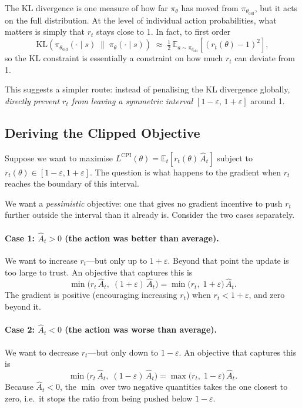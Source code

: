 \documentclass[12pt, a4paper]{article}
\theoremstyle{definition}
\theoremstyle{plain}
\theoremstyle{remark}
\newcommand{\E}{\mathbb{E}}
\newcommand{\pith}{\pi_\theta}
\newcommand{\piold}{\pi_{\theta_\mathrm{old}}}
\newcommand{\KL}{\mathrm{KL}}
\begin{document}
The KL divergence is one measure of how far $\pith$ has moved from $\piold$, but it
acts on the full distribution.  At the level of individual action probabilities, what
matters is simply that $r_t$ stays close to 1.  In fact, to first order
\begin{equation}
  \KL\!\left(\piold(\cdot \mid s) \;\|\; \pith(\cdot \mid s)\right)
  \;\approx\;
  \tfrac{1}{2}\,\E_{a \sim \piold}\!\left[(r_t(\theta) - 1)^2\right],
\end{equation}
so the KL constraint is essentially a constraint on how much $r_t$ can deviate from 1.

This suggests a simpler route: instead of penalising the KL divergence globally,
\emph{directly prevent $r_t$ from leaving a symmetric interval
$[1 - \varepsilon,\, 1 + \varepsilon]$} around 1.

\subsection{Deriving the Clipped Objective}

Suppose we want to maximise $L^{\mathrm{CPI}}(\theta) = \E_t[r_t(\theta)\,\hat{A}_t]$
subject to $r_t(\theta) \in [1-\varepsilon, 1+\varepsilon]$.  The question is what
happens to the gradient when $r_t$ reaches the boundary of this interval.

We want a \emph{pessimistic} objective: one that gives no gradient incentive to push
$r_t$ further outside the interval than it already is.  Consider the two cases
separately.

\paragraph{Case 1: $\hat{A}_t > 0$ (the action was better than average).}
We want to increase $r_t$---but only up to $1 + \varepsilon$.  Beyond that point the
update is too large to trust.  An objective that captures this is
\begin{equation}
  \min\!\bigl(r_t\,\hat{A}_t,\; (1+\varepsilon)\,\hat{A}_t\bigr)
  = \min\!\bigl(r_t,\; 1+\varepsilon\bigr)\,\hat{A}_t.
\end{equation}
The gradient is positive (encouraging increasing $r_t$) when $r_t < 1+\varepsilon$,
and zero beyond it.

\paragraph{Case 2: $\hat{A}_t < 0$ (the action was worse than average).}
We want to decrease $r_t$---but only down to $1 - \varepsilon$.  An objective that
captures this is
\begin{equation}
  \min\!\bigl(r_t\,\hat{A}_t,\; (1-\varepsilon)\,\hat{A}_t\bigr)
  = \max\!\bigl(r_t,\; 1-\varepsilon\bigr)\,\hat{A}_t.
\end{equation}
Because $\hat{A}_t < 0$, the $\min$ over two negative quantities takes the one
closest to zero, i.e.\ it stops the ratio from being pushed below $1 - \varepsilon$.
\end{document}
